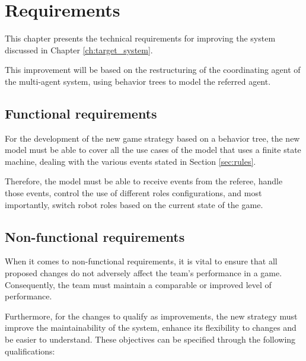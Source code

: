 \chapter{Requirements}
\label{ch:requirements}

This chapter presents the technical requirements for improving the system discussed in Chapter \ref{ch:target_system}.

This improvement will be based on the restructuring of the coordinating agent of the multi-agent system, using behavior trees to model the referred agent.

\section{Functional requirements}
\label{sec:functional_requirements}

For the development of the new game strategy based on a behavior tree, the new model must be able to cover all the use cases of the model that uses a finite state machine, dealing with the various events stated in Section \ref{sec:rules}.

Therefore, the model must be able to receive events from the referee, handle those events, control the use of different roles configurations, and most importantly, switch robot roles based on the current state of the game.

\section{Non-functional requirements}
\label{sec:non_functional_requirements}

When it comes to non-functional requirements, it is vital to ensure that all proposed changes do not adversely affect the team's performance in a game. Consequently, the team must maintain a comparable or improved level of performance.

Furthermore, for the changes to qualify as improvements, the new strategy must improve the maintainability of the system, enhance its flexibility to changes and be easier to understand. These objectives can be specified through the following qualifications:

